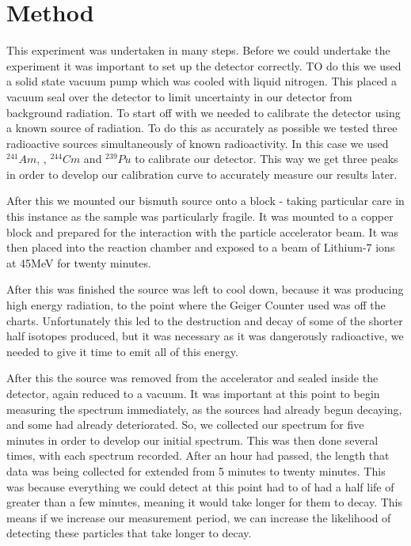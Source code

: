 \documentclass{article}
\begin{document}
\section{Method}
This experiment was undertaken in many steps. Before we could undertake the experiment it was important to set up the detector correctly. TO do this we used a solid state vacuum pump which was cooled with liquid nitrogen. This placed a vacuum seal over the detector to limit uncertainty in our detector from background radiation. To start off with we needed to calibrate the detector using a known source of radiation. To do this as accurately as possible we tested three radioactive sources simultaneously of known radioactivity. In this case we used $^{241}Am$, , $^{244}Cm$ and $^{239}Pu$ to calibrate our detector. This way we get three peaks in order to develop our calibration curve to accurately measure our results later.

After this we mounted our bismuth source onto a block - taking particular care in this instance as the sample was particularly fragile. It was mounted to a copper block and prepared for the interaction with the particle accelerator beam. It was then placed into the reaction chamber and exposed to a beam of Lithium-7 ions at 45MeV for twenty minutes.

After this was finished the source was left to cool down, because it was producing high energy radiation, to the point where the Geiger Counter used was off the charts. Unfortunately this led to the destruction and decay of some of the shorter half isotopes produced, but it was necessary as it was dangerously radioactive, we needed to give it time to emit all of this energy.

After this the source was removed from the accelerator and sealed inside the detector, again reduced to a vacuum. It was important at this point to begin measuring the spectrum immediately, as the sources had already begun decaying, and some had already deteriorated. So, we collected our spectrum for five minutes in order to develop our initial spectrum. This was then done several times, with each spectrum recorded. After an hour had passed, the length that data was being collected for extended from 5 minutes to twenty minutes. This was because everything we could detect at this point had to of had a half life of greater than a few minutes, meaning it would take longer for them to decay. This means if we increase our measurement period, we can increase the likelihood of detecting these particles that take longer to decay.
\end{document}
